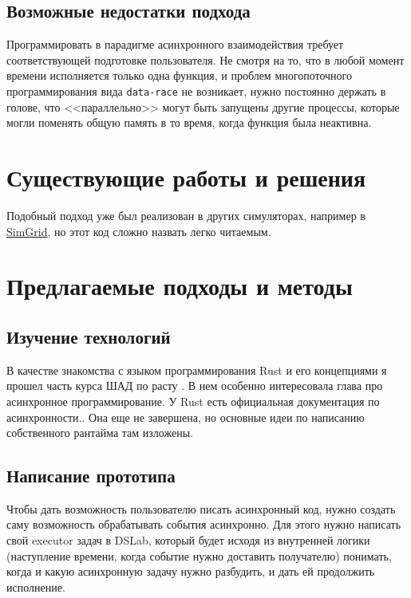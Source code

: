 \subsection{Возможные недостатки подхода}

Программировать в парадигме асинхронного взаимодействия требует соответствующей подготовке пользователя. Не смотря на то, что в любой момент времени исполняется только одна функция, и проблем многопоточного программирования вида \texttt{data-race} не возникает, нужно постоянно держать в голове, что <<параллельно>> могут быть запущены другие процессы, которые могли поменять общую память в то время, когда функция была неактивна. 

\section{Существующие работы и решения}

Подобный подход уже был реализован в других симуляторах, например в \href{https://github.com/osukhoroslov/dslab/blob/main/examples-other/simgrid/ping-pong/process.cpp}
{SimGrid}, но этот код сложно назвать легко читаемым. 

\section{Предлагаемые подходы и методы} 

\subsection{Изучение технологий}
В качестве знакомства с языком программирования Rust и его концепциями я прошел часть курса ШАД по расту \cite{shad-rust}. В нем особенно интересовала глава про асинхронное программирование. У Rust есть официальная документация по асинхронности.\cite{async-book}. Она еще не завершена, но основные идеи по написанию собственного рантайма там изложены.


\subsection{Написание прототипа}
Чтобы дать возможность пользователю писать асинхронный код, нужно создать саму возможность обрабатывать события асинхронно. Для этого нужно написать свой executor задач в DSLab, который будет исходя из внутренней логики (наступление времени, когда событие нужно доставить получателю) понимать, когда и какую асинхронную задачу нужно разбудить, и дать ей продолжить исполнение. 

